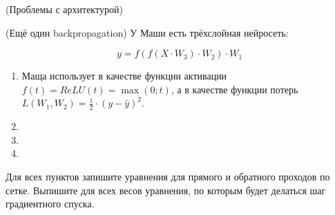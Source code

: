 \begin{problem}{(Проблемы с архитектурой)}

    


\end{problem}


\begin{problem}{(Ещё один backpropagation)}
    У Маши есть трёхслойная нейросеть: 
    
	$$ 
	y = f(f(X \cdot W_3 ) \cdot W_2) \cdot W_1 
	$$
	
	\begin{enumerate} 
	    \item Маща использует в качестве функции активации $f(t) = ReLU(t) =  \max(0; t)$, а в качестве функции потерь $L(W_1, W_2) = \frac{1}{2} \cdot (y - \hat y)^2$.
	    
	    \item 
	   
	    \item 
	    
	    \item 
	
	\end{enumerate}
	
	Для всех пунктов запишите уравнения для прямого и обратного проходов по сетке. Выпишите для всех весов уравнения, по которым будет делаться шаг градиентного спуска. 
\end{problem} 


